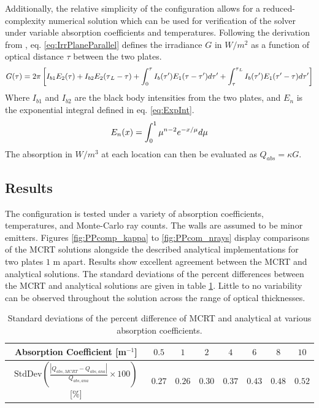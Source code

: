 Additionally, the relative simplicity of the configuration allows for a reduced-complexity numerical solution which can be used for verification of the solver under variable absorption coefficients and temperatures. Following the derivation from \citet{Modest2013RadiativeTransfer}, eq. \ref{eq:IrrPlaneParallel} defines the irradiance $G$ in $W/m^2$ as a function of optical distance $\tau{}$ between the two plates.
\begin{equation}
    \centering
    G(\tau{})=2\pi{}\left[I_{b1}E_2(\tau{})+I_{b2}E_2(\tau{}_L-\tau{})+\int_0^\tau{}I_b(\tau')E_1(\tau-\tau')d\tau'+\int^{\tau{}_L}_\tau{}I_b(\tau')E_1(\tau'-\tau)d\tau'\right]
    \label{eq:IrrPlaneParallel}
\end{equation}
Where $I_{b1}$ and $I_{b2}$ are the black body intensities from the two plates, and $E_n$ is the exponential integral defined in eq. \ref{eq:ExpInt}.
\begin{equation}
    \centering
    E_n(x)=\int_0^1\mu{}^{n-2}e^{-x/\mu{}}d\mu{}
    \label{eq:ExpInt}
\end{equation}
The absorption in $W/m^3$ at each location can then be evaluated as $Q_{abs}=\kappa{}G$.

\subsection{Results}
The configuration is tested under a variety of absorption coefficients, temperatures, and Monte-Carlo ray counts. The walls are assumed to be minor emitters.
Figures \ref{fig:PPcomp_kappa} to \ref{fig:PPcom_nrays} display comparisons of the MCRT solutions alongside the described analytical implementations for two plates $1$ m apart. 
Results show excellent agreement between the MCRT and analytical solutions. The standard deviations of the percent differences between the MCRT and analytical solutions are given in table \ref{table:PPcomp_std}. Little to no variability can be observed throughout the solution across the range of optical thicknesses.
\begin{table}
\centering
\caption{Standard deviations of the percent difference of MCRT and analytical at various absorption coefficients.}
\begin{tabular}{||c c c c c c c c||} 
 \hline
 Absorption Coefficient [m$^{-1}$] & $0.5$ & $1$ & $2$ & $4$ & $6$ & $8$ & $10$\\ [0.5ex] 
 \hline\hline
 $\text{StdDev}\left(\frac{|Q_{abs,MCRT}-Q_{abs,ana}|}{Q_{abs,ana}}\times{100}\right)$ [\%]& $0.27$ & $0.26$ & $0.30$ & $0.37$ & $0.43$ & $0.48$ & $0.52$\\
 \hline
\end{tabular}
\label{table:PPcomp_std}
\end{table}

